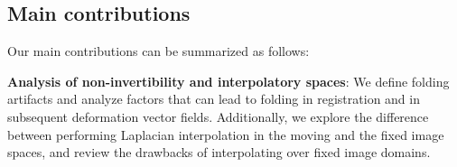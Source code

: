 




\subsection{Main contributions}
\label{subsec:main_contributions}

Our main contributions can be summarized as follows:

\textbf{Analysis of non-invertibility and interpolatory spaces}: We define folding artifacts and analyze factors that can lead to folding in registration and in subsequent deformation vector fields. Additionally, we explore the difference between performing Laplacian interpolation in the moving and the fixed image spaces, and review the drawbacks of interpolating over fixed image domains.

